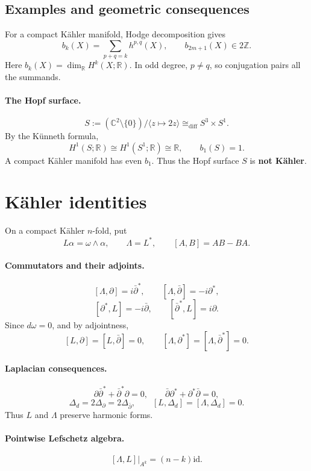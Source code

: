 \documentclass[11pt]{article}
\newcommand{\C}{\mathbb C}
\newcommand{\R}{\mathbb R}
\newcommand{\Z}{\mathbb Z}
\newcommand{\id}{\mathrm{id}}
\newcommand{\bdel}{\bar\partial}
\begin{document}
\subsection*{Examples and geometric consequences}
For a compact K\"ahler manifold, Hodge decomposition gives
\[
 b_k(X)=\sum_{p+q=k}h^{p,q}(X),\qquad b_{2m+1}(X)\in2\Z.
\]
Here $b_k(X)=\dim_{\R}H^k(X;\R)$. In odd degree, $p\neq q$,
so conjugation pairs all the summands.

\paragraph{The Hopf surface.}
\[
 S:=(\C^2\setminus\{0\})/\langle z\mapsto2z\rangle
 \cong_{\mathrm{diff}}S^3\times S^1.
\]
By the K\"unneth formula,
\[
 H^1(S;\R)\cong H^1(S^1;\R)\cong\R,\qquad b_1(S)=1.
\]
A compact K\"ahler manifold has even $b_1$.
Thus the Hopf surface $S$ is \textbf{not K\"ahler}.

\section*{K\"ahler identities}
On a compact K\"ahler $n$-fold, put
\[
 L\alpha=\omega\wedge\alpha,\qquad \Lambda=L^*,\qquad
 [A,B]=AB-BA.
\]
\paragraph{Commutators and their adjoints.}
\[
 [\Lambda,\partial]=i\bdel^*,\qquad
 [\Lambda,\bdel]=-i\partial^*,
\]
\[
 [\partial^*,L]=-i\bdel,\qquad
 [\bdel^*,L]=i\partial.
\]
Since $d\omega=0$, and by adjointness,
\[
 [L,\partial]=[L,\bdel]=0,\qquad
 [\Lambda,\partial^*]=[\Lambda,\bdel^*]=0.
\]
\paragraph{Laplacian consequences.}
\[
 \partial\bdel^*+\bdel^*\partial=0,\qquad
 \bdel\partial^*+\partial^*\bdel=0,
\]
\[
 \Delta_d=2\Delta_{\partial}=2\Delta_{\bdel},\qquad
 [L,\Delta_d]=[\Lambda,\Delta_d]=0.
\]
Thus $L$ and $\Lambda$ preserve harmonic forms.
\paragraph{Pointwise Lefschetz algebra.}
\[
 [\Lambda,L]|_{A^k}=(n-k)\id.
\]

\end{document}
